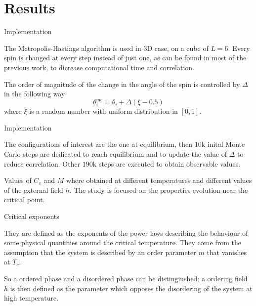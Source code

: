 \documentclass{beamer}
\begin{document}
\section{Results}

\begin{frame}{Implementation}

The Metropolis-Hastings algorithm is used in 3D case, on a cube of $L=6$. Every
spin is changed at every step instead of just one, as can be found in most of 
the previous work, to dicrease computational time and correlation.

\vspace{3mm}

The order of magnitude of the change in the angle of the spin is controlled by
$\Delta$ in the following way
\begin{equation*}
\theta_i^{\text{mc}} = \theta_i + \Delta (\xi - 0.5)
\end{equation*}
where $\xi$ is a random number with uniform distribution in $[0,1]$.

\end{frame}

\begin{frame}{Implementation}

The configurations of interest are the one at equilibrium, then $10\text{k}$ 
inital Monte Carlo steps are dedicated to reach equilibrium and to update the
value of $\Delta$ to reduce correlation. Other $190\text{k}$ steps are executed to
obtain observable values.

\vspace{5mm}

Values of $C_v$ and $M$ where obtained at different temperatures and different
values of the external field $h$. The study is focused on the properties evolution
near the critical point.

\end{frame}

\begin{frame}{Critical exponents}

They are defined as the exponents of the power laws describing the behaviour of 
some physical quantities around the critical temperature. They come from the
assumption that the system is described by an order parameter $m$ that vanishes at
$T_c$.

\vspace{5mm}

So a ordered phase and a disordered phase can be distingiushed: a ordering field
$h$ is then defined as the parameter which opposes the disordering of the system
at high temperature.
\end{frame}
\end{document}
